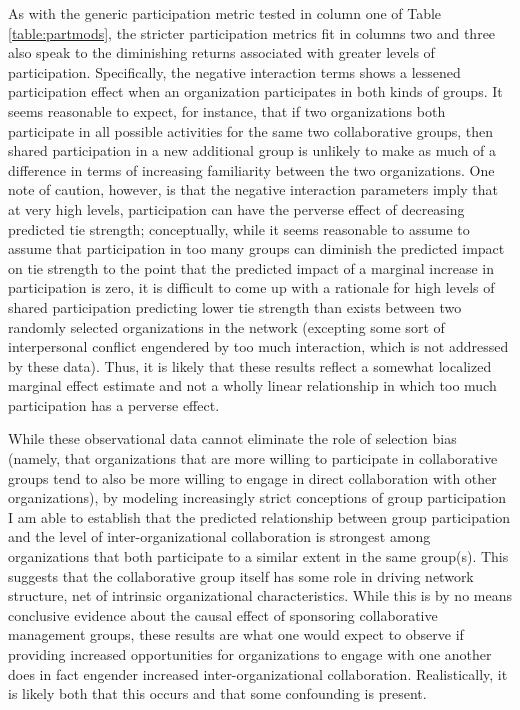 \documentclass[12pt,a4paper,titlepage]{article}
\begin{document}
As with the generic participation metric tested in column one of Table \ref{table:partmods}, the stricter participation metrics fit in columns two and three also speak to the diminishing returns associated with greater levels of participation. Specifically, the negative interaction terms shows a lessened participation effect when an organization participates in both kinds of groups. It seems reasonable to expect, for instance, that if two organizations both participate in all possible activities for the same two collaborative groups, then shared participation in a new additional group is unlikely to make as much of a difference in terms of increasing familiarity between the two organizations. One note of caution, however, is that the negative interaction parameters imply that at very high levels, participation can have the perverse effect of decreasing predicted tie strength; conceptually, while it seems reasonable to assume to assume that participation in too many groups can diminish the predicted impact on tie strength to the point that the predicted impact of a marginal increase in participation is zero, it is difficult to come up with a rationale for high levels of shared participation predicting lower tie strength than exists between two randomly selected organizations in the network (excepting some sort of interpersonal conflict engendered by too much interaction, which is not addressed by these data). Thus, it is likely that these results reflect a somewhat localized marginal effect estimate and not a wholly linear relationship in which too much participation has a perverse effect. 

While these observational data cannot eliminate the role of selection bias (namely, that organizations that are more willing to participate in collaborative groups tend to also be more willing to engage in direct collaboration with other organizations), by modeling increasingly strict conceptions of group participation I am able to establish that the predicted relationship between group participation and the level of inter-organizational collaboration is strongest among organizations that both participate to a similar extent in the same group(s). This suggests that the collaborative group itself has some role in driving network structure, net of intrinsic organizational characteristics. While this is by no means conclusive evidence about the causal effect of sponsoring collaborative management groups, these results are what one would expect to observe if providing increased opportunities for organizations to engage with one another does in fact engender increased inter-organizational collaboration. Realistically, it is likely both that this occurs and that some confounding is present. 
\end{document}
